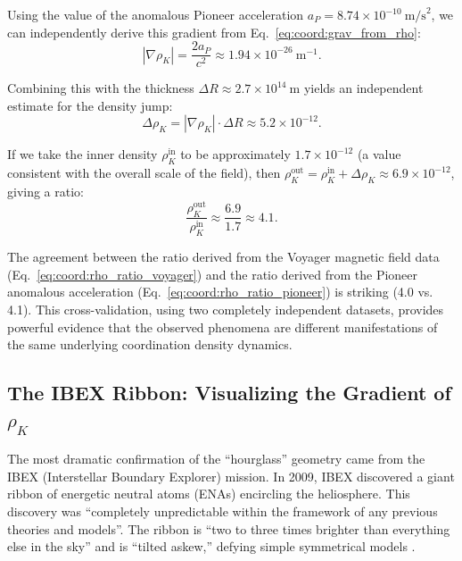 \documentclass[12pt,a4paper]{article}
\theoremstyle{remark}
\begin{document}
	Using the value of the anomalous Pioneer acceleration \(a_P = 8.74 \times 10^{-10}\ \text{m/s}^2\), we can independently derive this gradient from Eq.~\eqref{eq:coord:grav_from_rho}:
	\begin{equation}
		|\nabla \rho_K| = \frac{2a_P}{c^2} \approx 1.94 \times 10^{-26}\ \text{m}^{-1}.
		\label{eq:coord:gradient_pioneer}
	\end{equation}
	
	Combining this with the thickness \(\Delta R \approx 2.7 \times 10^{14}\ \text{m}\) yields an independent estimate for the density jump:
	\begin{equation}
		\Delta \rho_K = |\nabla \rho_K| \cdot \Delta R \approx 5.2 \times 10^{-12}.
		\label{eq:coord:delta_rho_pioneer}
	\end{equation}
	
	If we take the inner density \(\rho_K^{\text{in}}\) to be approximately \(1.7 \times 10^{-12}\) (a value consistent with the overall scale of the field), then \(\rho_K^{\text{out}} = \rho_K^{\text{in}} + \Delta \rho_K \approx 6.9 \times 10^{-12}\), giving a ratio:
	\begin{equation}
		\frac{\rho_K^{\text{out}}}{\rho_K^{\text{in}}} \approx \frac{6.9}{1.7} \approx 4.1.
		\label{eq:coord:rho_ratio_pioneer}
	\end{equation}
	
	The agreement between the ratio derived from the Voyager magnetic field data (Eq.~\eqref{eq:coord:rho_ratio_voyager}) and the ratio derived from the Pioneer anomalous acceleration (Eq.~\eqref{eq:coord:rho_ratio_pioneer}) is striking (4.0 vs. 4.1). This cross-validation, using two completely independent datasets, provides powerful evidence that the observed phenomena are different manifestations of the same underlying coordination density dynamics.
	
	\subsection{The IBEX Ribbon: Visualizing the Gradient of \(\rho_K\)}
	\label{subsec:coord:ibex}
	
	The most dramatic confirmation of the ``hourglass'' geometry came from the IBEX (Interstellar Boundary Explorer) mission. In 2009, IBEX discovered a giant ribbon of energetic neutral atoms (ENAs) encircling the heliosphere. This discovery was ``completely unpredictable within the framework of any previous theories and models''. The ribbon is ``two to three times brighter than everything else in the sky'' and is ``tilted askew,'' defying simple symmetrical models .
	
\end{document}
